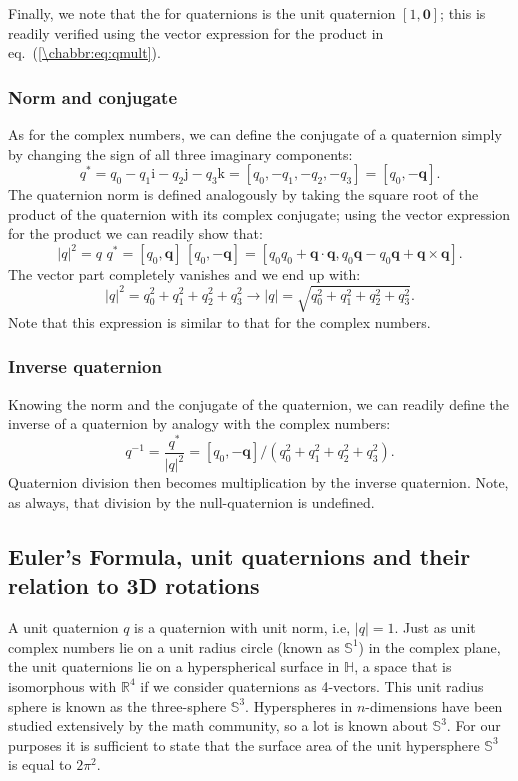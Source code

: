 Finally, we note that the  for quaternions is the unit quaternion $[1,\mathbf{0}]$; this is readily verified using the vector expression for the product in eq.~(\ref{\chabbr:eq:qmult}).

\subsubsection{Norm and conjugate}
As for the complex numbers, we can define the conjugate of a quaternion simply by changing the sign of all three imaginary components:
\begin{equation}
	q^{\ast} = q_0 -q_1\mathrm{i}-q_2\mathrm{j}-q_3\mathrm{k}= [q_0,-q_1,-q_2,-q_3] = [q_0,-\mathbf{q}].
\end{equation}
The quaternion norm is defined analogously by taking the square root of the product of the quaternion with its complex conjugate; using the vector expression for the product we can readily show that:
\begin{equation}
	\vert q\vert^2 = q\,\,q^{\ast} = [q_0,\mathbf{q}]\,[q_0,-\mathbf{q}] = [ q_0q_0+\mathbf{q}\cdot\mathbf{q}, q_0\mathbf{q}-q_0\mathbf{q}+\mathbf{q}\times\mathbf{q} ].
\end{equation}
The vector part completely vanishes and we end up with:
\begin{equation}
	\vert q\vert^2 = q_0^2+q_1^2+q_2^2+q_3^2\rightarrow \vert q\vert = \sqrt{q_0^2+q_1^2+q_2^2+q_3^2}.
\end{equation}
Note that this expression is similar to that for the complex numbers.

\subsubsection{Inverse quaternion}
Knowing the norm and the conjugate of the quaternion, we can readily define the inverse of a quaternion by analogy with the complex numbers:
\begin{equation}
	q^{-1} = \frac{q^{\ast}}{\vert q\vert^2} = [q_0,-\mathbf{q}] / (q_0^2+q_1^2+q_2^2+q_3^2).
\end{equation}
Quaternion division then becomes multiplication by the inverse quaternion.  Note, as always, that division by the null-quaternion is undefined.

\subsection{Euler's Formula, unit quaternions and their relation to 3D rotations}\label{\chabbr:ssec:EulerFormula}
A unit quaternion $q$ is a quaternion with unit norm, i.e, $\vert q\vert=1$.  Just as unit complex numbers lie on a unit radius circle (known as $\mathbb{S}^1$) in the complex plane, the unit quaternions lie on a hyperspherical surface in $\mathbb{H}$, a space that is isomorphous with $\mathbb{R}^4$ if we consider quaternions as 4-vectors. This unit radius sphere is known as the three-sphere $\mathbb{S}^3$.  Hyperspheres in $n$-dimensions have been studied extensively by the math community, so a lot is known about $\mathbb{S}^3$.  For our purposes it is sufficient to state that the surface area of the unit hypersphere $\mathbb{S}^3$ is equal to $2\pi^2$.

